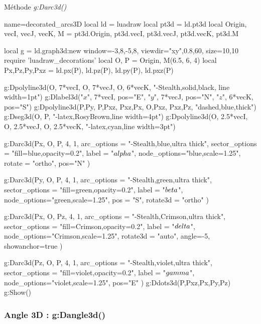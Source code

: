 \begin{demo}{Méthode \emph{g:Darc3d()}}
\begin{luadraw}{name=decorated_arcs3D}
local ld = luadraw
local pt3d = ld.pt3d
local Origin, vecI, vecJ, vecK, M = pt3d.Origin, pt3d.vecI, pt3d.vecJ, pt3d.vecK, pt3d.M

local g = ld.graph3d:new{ window={-3,8,-5,8}, viewdir={"xy",0.8,60}, size={10,10} }
require 'luadraw_decorations'
local O, P = Origin, M(6.5, 6, 4)
local Px,Pz,Py,Pxz = ld.px(P), ld.pz(P), ld.py(P), ld.pxz(P)

g:Dpolyline3d({{O, 7*vecI}, {O, 7*vecJ}, {O, 6*vecK}}, "-Stealth,solid,black, line width=1pt")
g:Dlabel3d("$x$", 7*vecI, {pos="E"}, "$y$", 7*vecJ, {pos="N"}, "$z$", 6*vecK, {pos="S"})
g:Dpolyline3d({{P,Py}, {P,Pxz}, {Pxz,Px}, {O,Pxz}, {Pxz,Pz}}, "dashed,blue,thick")
g:Dseg3d({O, P}, "-latex,RosyBrown,line width=4pt")
g:Dpolyline3d({{O, 2.5*vecI}, {O, 2.5*vecJ}, {O, 2.5*vecK}}, "-latex,cyan,line width=3pt")

g:Darc3d(Px, O, P, 4, 1, {
    arc_options = "-Stealth,blue,ultra thick",
    sector_options = "fill=blue,opacity=0.2",
    label = "$\\alpha$", node_options="blue,scale=1.25",
    rotate = "ortho", pos="N" })
     
g:Darc3d(Py, O, P, 4, 1, {
    arc_options = "-Stealth,green,ultra thick",
    sector_options = "fill=green,opacity=0.2",
    label = "$\\beta$", node_options="green,scale=1.25",
    pos = "S", rotate3d = "ortho"  }) 
     
g:Darc3d(Px, O, Pz, 4, 1, {
    arc_options = "-Stealth,Crimson,ultra thick",
    sector_options = "fill=Crimson,opacity=0.2",
    label = "$\\delta$", node_options="Crimson,scale=1.25",
    rotate3d = "auto", angle=-5,
    showanchor=true  })  

g:Darc3d(Pz, O, P, 4, 1, {
    arc_options = "-Stealth,violet,ultra thick",
    sector_options = "fill=violet,opacity=0.2",
    label = "$\\gamma$", node_options="violet,scale=1.25",
    pos="E"  }) 
g:Ddots3d({P,Pxz,Px,Py,Pz})     
g:Show()
\end{luadraw}
\end{demo}

\subsubsection{Angle 3D : g:Dangle3d()}

